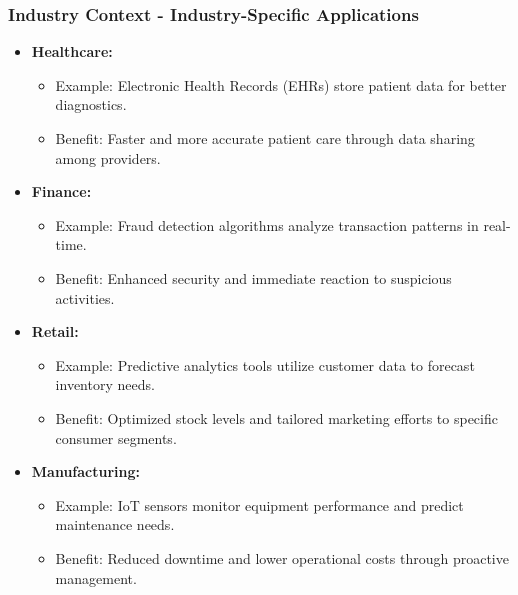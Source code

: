 \documentclass{beamer}
\begin{document}
\begin{frame}[fragile]
    \frametitle{Industry Context - Industry-Specific Applications}
    \begin{itemize}
        \item \textbf{Healthcare:}
          \begin{itemize}
              \item Example: Electronic Health Records (EHRs) store patient data for better diagnostics.
              \item Benefit: Faster and more accurate patient care through data sharing among providers.
          \end{itemize}
          
        \item \textbf{Finance:}
          \begin{itemize}
              \item Example: Fraud detection algorithms analyze transaction patterns in real-time.
              \item Benefit: Enhanced security and immediate reaction to suspicious activities.
          \end{itemize}
          
        \item \textbf{Retail:}
          \begin{itemize}
              \item Example: Predictive analytics tools utilize customer data to forecast inventory needs.
              \item Benefit: Optimized stock levels and tailored marketing efforts to specific consumer segments.
          \end{itemize}
          
        \item \textbf{Manufacturing:}
          \begin{itemize}
              \item Example: IoT sensors monitor equipment performance and predict maintenance needs.
              \item Benefit: Reduced downtime and lower operational costs through proactive management.
          \end{itemize}
    \end{itemize}
\end{frame}
\end{document}
